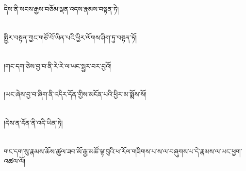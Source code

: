 དིས་ནི་སངས་རྒྱས་བཅོམ་ལྡན་འདས་རྣམས་བསྟན་ཏེ།\chapter{ }སྤྱིར་བསྟན་ཀྱང་གཙོ་བོ་ཡིན་པའི་ཕྱིར་ལོགས་ཤིག་ཏུ་བསྟན་ཏོ།\chapter{ }།གང་དག་ཅེས་བྱ་བ་ནི་རེ་རེ་ལ་ཡང་སྦྱར་བར་བྱའོ།\chapter{ }།ཡང་ཞེས་བྱ་བ་ཞིག་ནི་འདིར་དོན་གྱིས་མངོན་པའི་ཕྱིར་མ་སྨོས་སོ།\chapter{ }།དེས་ན་དོན་ནི་འདི་ཡིན་ཏེ།\chapter{ }གང་དག་སུ་རྣམས་ཆོས་ཚུལ་ཟབ་མོ་རྒྱ་མཚོ་ལྟ་བུའི་ཕ་རོལ་གཟིགས་པ་ས་ལ་བཞུགས་པ་དེ་རྣམས་ལ་ཡང་ཕྱག་འཚལ་ལོ།\cha